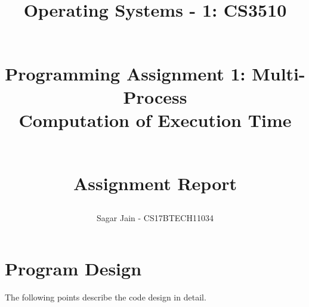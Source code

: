 \documentclass[a4paper,12pt]{report}
\begin{document}
\title{
Operating Systems - 1: CS3510\\~\\
\begin{large}
Programming Assignment 1: Multi-Process\\Computation of Execution Time\\~\\
\end{large}
\begin{large}
Assignment Report
\end{large}
}
\author{Sagar Jain - CS17BTECH11034\\}
\maketitle
\section*{Program Design}
The following points describe the code design in detail.
\end{document}
